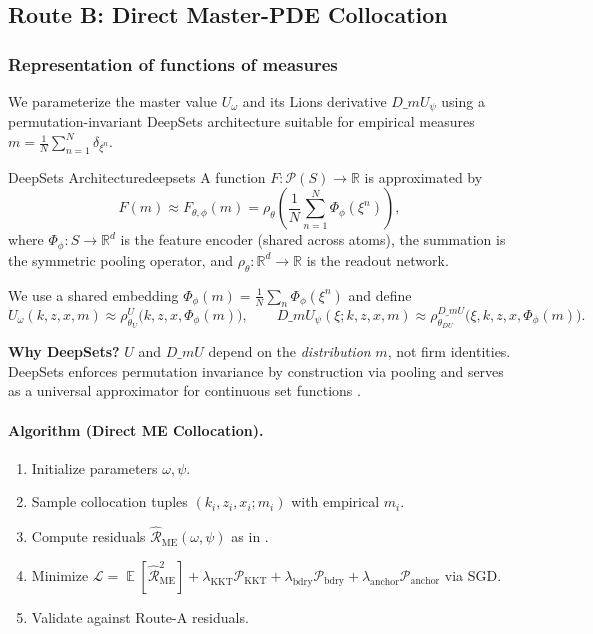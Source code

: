 ﻿\documentclass[11pt,letterpaper,oneside]{article}
\numberwithin{equation}{section}
\DeclareMathOperator{\E}{\mathbb{E}}
\newcommand{\R}{\mathbb{R}}
\newcommand{\1}{\mathbf{1}}
\newcommand{\dmU}{D\_m U}
\newcommand{\Dm}{D\_m}
\begin{document}
\subsection{Route B: Direct Master-PDE Collocation}\label{sec:routeB}

\subsubsection*{Representation of functions of measures}
We parameterize the master value $U_\omega$ and its Lions derivative $\dmU_\psi$ using a permutation-invariant DeepSets architecture \cite{zaheer2017deepsets} suitable for empirical measures $m=\tfrac1N\sum_{n=1}^N\delta_{\xi^n}$.

\begin{definition}{DeepSets Architecture}{deepsets}
A function $F:\mathcal{P}(S)\to\R$ is approximated by
\[
F(m) \approx F_{\theta,\phi}(m) = \rho_\theta\!\left( \frac{1}{N}\sum_{n=1}^N \Phi_\phi(\xi^n) \right),
\]
where $\Phi_\phi:S\to\R^d$ is the feature encoder (shared across atoms), the summation is the symmetric pooling operator, and $\rho_\theta: \R^d\to\R$ is the readout network.
\end{definition}

We use a shared embedding $\Phi_\phi(m)=\tfrac{1}{N}\sum_n \Phi_\phi(\xi^n)$ and define
\[
U_\omega(k,z,x,m) \approx \rho^U_{\theta_U}\big(k,z,x,\Phi_\phi(m)\big),\qquad
\dmU_\psi(\xi; k,z,x,m) \approx \rho^{\Dm U}_{\theta_{DU}}\big(\xi,k,z,x,\Phi_\phi(m)\big).
\]

\begin{tcolorbox}[didacticstyle]
\textbf{Why DeepSets?} $U$ and $\Dm U$ depend on the \emph{distribution} $m$, not firm identities. DeepSets enforces permutation invariance by construction via pooling and serves as a universal approximator for continuous set functions \cite{zaheer2017deepsets}.
\end{tcolorbox}

\paragraph{Algorithm (Direct ME Collocation).}
\begin{enumerate}[leftmargin=1.5em,label=\textbf{B.\arabic*}]
\item Initialize parameters $\omega,\psi$.
\item Sample collocation tuples $(k_i,z_i,x_i; m_i)$ with empirical $m_i$.
\item Compute residuals $\widehat{\mathcal{R}}_{\mathrm{ME}}(\omega,\psi)$ as in .
\item Minimize $\mathcal{L}=\E[\widehat{\mathcal{R}}_{\mathrm{ME}}^2]+\lambda_{\mathrm{KKT}}\mathcal{P}_{\mathrm{KKT}}+\lambda_{\mathrm{bdry}}\mathcal{P}_{\mathrm{bdry}}+\lambda_{\mathrm{anchor}}\mathcal{P}_{\mathrm{anchor}}$ via SGD.
\item Validate against Route-A residuals.
\end{enumerate}
\end{document}
